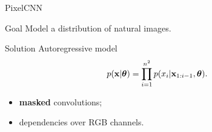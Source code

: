 \begin{frame}{PixelCNN}
	\begin{block}{Goal}
	Model a distribution of natural images.
	\end{block}
	\begin{block}{Solution}
	Autoregressive model
	\[
	    p(\mathbf{x} | \boldsymbol{\theta}) = \prod_{i=1}^{n^2} p(x_i|\mathbf{x}_{1:i-1}, \boldsymbol{\theta}).
	\]
	\begin{itemize}
	    \item \textbf{masked} convolutions;
	    \item dependencies over RGB channels.
	\end{itemize}
	\end{block}
\end{frame}
